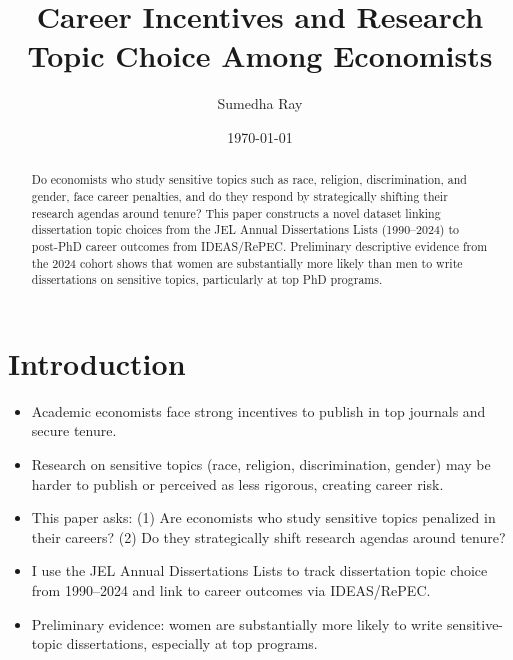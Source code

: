 \documentclass[12pt,a4paper]{article}
\title{Career Incentives and Research Topic Choice Among Economists}
\author{Sumedha Ray}
\date{\today}
\begin{document}
\maketitle
{
\singlespacing
\begin{abstract}
Do economists who study sensitive topics such as race, religion, discrimination, and gender, face career penalties, and do they respond by strategically shifting their research agendas around tenure? This paper constructs a novel dataset linking dissertation topic choices from the JEL Annual Dissertations Lists (1990--2024) to post-PhD career outcomes from IDEAS/RePEC. Preliminary descriptive evidence from the 2024 cohort shows that women are substantially more likely than men to write dissertations on sensitive topics, particularly at top PhD programs.
\end{abstract}
}

\newpage

\section{Introduction}
\label{sec:intro}
\begin{itemize}
    \item Academic economists face strong incentives to publish in top journals and secure tenure.
    \item Research on sensitive topics (race, religion, discrimination, gender) may be harder to publish or perceived as less rigorous, creating career risk.
    \item This paper asks: (1) Are economists who study sensitive topics penalized in their careers? (2) Do they strategically shift research agendas around tenure?
    \item I use the JEL Annual Dissertations Lists to track dissertation topic choice from 1990--2024 and link to career outcomes via IDEAS/RePEC.
    \item Preliminary evidence: women are substantially more likely to write sensitive-topic dissertations, especially at top programs.
\end{itemize}
\end{document}

